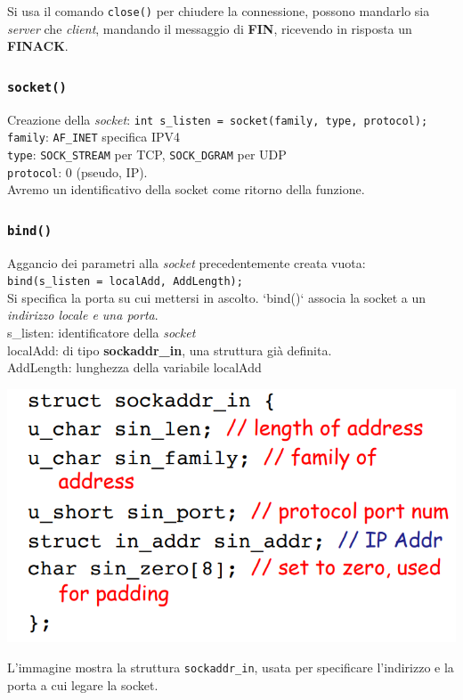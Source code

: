 Si usa il comando \texttt{close()} per chiudere la connessione, possono mandarlo sia \textit{server} che \textit{client}, mandando il messaggio di \textbf{FIN}, ricevendo in risposta un \textbf{FINACK}.

\subsubsection*{\texttt{socket()}}
Creazione della \textit{socket}: \texttt{int s\_listen = socket(family, type, protocol);} \\
\texttt{family}: \texttt{AF\_INET} specifica IPV4 \\ \texttt{type}: \texttt{SOCK\_STREAM} per TCP, \texttt{SOCK\_DGRAM} per UDP \\ \texttt{protocol}: 0 (pseudo, IP). \\
Avremo un identificativo della socket come ritorno della funzione.

\subsubsection*{\texttt{bind()}}
Aggancio dei parametri alla \textit{socket} precedentemente creata vuota: \\
\texttt{bind(s\_listen = localAdd, AddLength);} \\
Si specifica la porta su cui mettersi in ascolto. `bind()` associa la socket a un \textit{indirizzo locale e una porta}. \\
s\_listen: identificatore della \textit{socket} \\
localAdd: di tipo \textbf{sockaddr\_in}, una struttura già definita. \\
AddLength: lunghezza della variabile localAdd \\
\begin{center}
\includegraphics[width=\textwidth]{./img/struct_sockaddr_In.png}
\end{center}
L'immagine mostra la struttura \texttt{sockaddr\_in}, usata per specificare l'indirizzo e la porta a cui legare la socket.

